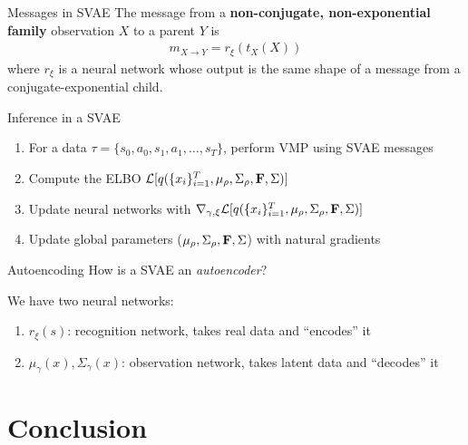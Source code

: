 \documentclass[10pt, compress]{beamer}
\begin{document}
\begin{frame}{Messages in SVAE}
  The message from a \textbf{non-conjugate, non-exponential family} observation $X$ to a parent $Y$ is
  \begin{align*}
    m_{X \rightarrow Y} = r_\xi(t_X(X))
  \end{align*}
  where $r_\xi$ is a neural network whose output
  is the same shape of a message from a conjugate-exponential child.

  \pause
  \begin{block}{Inference in a SVAE}
    \begin{enumerate}
      \item For a data $\tau = \{s_0, a_0, s_1, a_1, \ldots, s_T\}$,
        perform VMP using SVAE messages
      \item Compute the ELBO $\mathcal{L}[q(\{x_i\}_{i = 1}^T, \mu_{\rho}, \Sigma_{\rho}, \mathbf{F}, \Sigma)]$
      \item Update neural networks with $\nabla_{\gamma, \xi} \mathcal{L}[q(\{x_i\}_{i = 1}^T, \mu_{\rho}, \Sigma_{\rho}, \mathbf{F}, \Sigma)]$
      \item Update global parameters ($\mu_{\rho}, \Sigma_{\rho}, \mathbf{F}, \Sigma$) with natural gradients
    \end{enumerate}
  \end{block}
\end{frame}

\begin{frame}{Autoencoding}
  How is a SVAE an \emph{autoencoder}?

  \begin{center}
  
  \end{center}

  \pause
  We have two neural networks:
  \begin{enumerate}
    \pause
    \item $r_\xi(s)$: recognition network, takes real data and ``encodes'' it
    \pause
    \item $\mu_\gamma(x), \Sigma_\gamma(x)$: observation network, takes latent data and ``decodes'' it
  \end{enumerate}
\end{frame}

\section{Conclusion}
\end{document}
